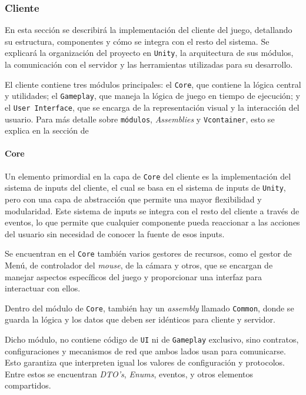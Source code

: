 \subsubsection{Cliente}

En esta sección se describirá la implementación del cliente del juego, detallando su estructura, componentes 
y cómo se integra con el resto del sistema. Se explicará la organización del proyecto en \texttt{Unity}, la 
arquitectura de sus módulos, la comunicación con el servidor y las herramientas utilizadas para su desarrollo.

El cliente contiene tres módulos principales: el \texttt{Core}, que contiene la lógica central y utilidades; 
el \texttt{Gameplay}, que maneja la lógica de juego en tiempo de ejecución; y el \texttt{User Interface}, 
que se encarga de la representación visual y la interacción del usuario. Para más detalle sobre \texttt{módulos}, 
\textit{Assemblies} y \texttt{Vcontainer}, esto se explica en la sección de 

\paragraph{Core}

Un elemento primordial en la capa de \texttt{Core} del cliente es la implementación del sistema de inputs del cliente, 
el cual se basa en el sistema de inputs de \texttt{Unity}, pero con una capa de abstracción que permite una mayor 
flexibilidad y modularidad. Este sistema de inputs se integra con el resto del cliente a través de eventos, 
lo que permite que cualquier componente pueda reaccionar a las acciones del usuario sin necesidad de conocer 
la fuente de esos inputs.

Se encuentran en el \texttt{Core} también varios gestores de recursos, como el gestor de Menú, de controlador del 
\textit{mouse}, de la cámara y otros, que se encargan de manejar aspectos específicos del juego y proporcionar una 
interfaz para interactuar con ellos.

\vspace{0.20cm}

Dentro del módulo de \texttt{Core}, también hay un \textit{assembly} llamado \texttt{Common}, donde se guarda 
la lógica y los datos que deben ser idénticos para cliente y servidor. 

Dicho módulo, no contiene código de \texttt{UI} ni de \texttt{Gameplay} exclusivo, sino contratos, 
configuraciones y mecanismos de red que ambos lados usan para comunicarse. 
Esto garantiza que interpreten igual los valores de configuración y protocolos. 
Entre estos se encuentran \textit{DTO's}, \textit{Enums}, eventos, y otros elementos compartidos. 

